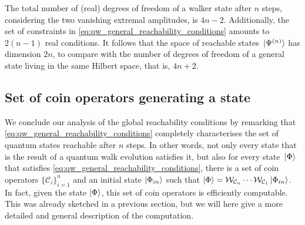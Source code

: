The total number of (real) degrees of freedom of a walker state after $n$ steps, considering the two vanishing extremal amplitudes, is $4n - 2$.
Additionally, the set of constraints in \cref{eq:qw_general_reachability_conditions} amounts to $2(n-1)$ real conditions.
It follows that the space of reachable states $\ket*{\Psi^{(n)}}$ has dimension $2n$, to compare with the number of degrees of freedom of a general state living in the same Hilbert space, that is, $4n + 2$.

\subsection{Set of coin operators generating a state}
\label{sec:coin_operators_generating_state}
We conclude our analysis of the global reachability conditions by remarking that \cref{eq:qw_general_reachability_conditions} completely characterises the set of quantum states reachable after $n$ steps.
In other words, not only every state that is the result of a quantum walk evolution satisfies it, but also for every state $\ket*{\Phi}$ that satisfies \cref{eq:qw_general_reachability_conditions}, there is a set of coin operators $\{ \mathcal C_i \}_{i=1}^n$ and an initial state $\ket{\Phi_{in}}$ such that
$\ket\Phi = 
	\mathcal W_{\mathcal C_n} \cdots \mathcal W_{\mathcal C_1}
	\ket{\Phi_{in}}$.
In fact, given the state $\ket\Phi$, this set of coin operators is efficiently computable.
This was already sketched in a previous section, but we will here give a more detailed and general description of the computation.
